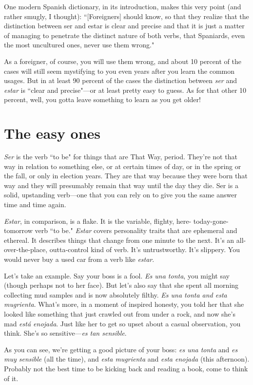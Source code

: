 One modern Spanish dictionary, in its introduction, makes
this very point (and rather smugly, I thought): ``[Foreigners] should
know, so that they realize that the distinction between ser and estar is
clear and precise and that it is just a matter of managing to penetrate
the distinct nature of both verbs, that Spaniards, even the most uncultured ones, never use them wrong."

As a foreigner, of course, you will use them wrong, and about
10 percent of the cases will still seem mystifying to you even years
after you learn the common usages. But in at least 90 percent of the
cases the distinction between \emph{ser} and \emph{estar} is ``clear and precise"---or
at least pretty easy to guess. As for that other 10 percent, well, you
gotta leave something to learn as you get older!

\section{The easy ones}

\emph{Ser} is the verb ``to be" for things that are That Way, period.
They're not that way in relation to something else, or at certain times
of day, or in the spring or the fall, or only in election years. They are
that way because they were born that way and they will presumably
remain that way until the day they die. Ser is a solid, upstanding
verb---one that you can rely on to give you the same answer time
and time again.

\emph{Estar}, in comparison, is a flake. It is the variable, flighty, here-
today-gone-tomorrow verb ``to be." \emph{Estar} covers personality traits that
are ephemeral and ethereal. It describes things that change from one
minute to the next. It's an all-over-the-place, outta-control kind of
verb. It's untrustworthy. It's slippery. You would never buy a used car
from a verb like \emph{estar}.

Let's take an example. Say your boss is a fool. \emph{Es una tonta},
you might say (though perhaps not to her face). But let's also say that
she spent all morning collecting mud samples and is now absolutely
filthy. \emph{Es una tonta and esta mugrienta}. What's more, in a moment of
inspired honesty, you told her that she looked like something that just
crawled out from under a rock, and now she's mad \emph{está enojada}. Just
like her to get so upset about a casual observation, you think. She's so
sensitive---\emph{es tan sensible}.

As you can see, we're getting a good picture of your boss: \emph{es
una tonta} and \emph{es muy sensible} (all the time), and \emph{esta mugrienta} and
\emph{esta enojada} (this afternoon). Probably not the best time to be kicking
back and reading a book, come to think of it.


